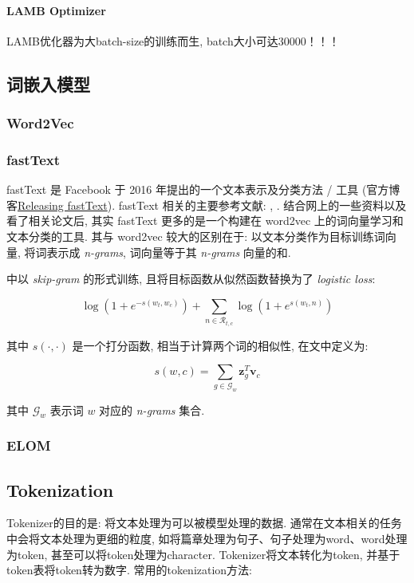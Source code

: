 \paragraph{LAMB Optimizer}
LAMB优化器为大batch-size的训练而生, batch大小可达30000！！！


\subsection{词嵌入模型}
\subsubsection{Word2Vec}

\subsubsection{fastText}
fastText 是 Facebook 于 2016 年提出的一个文本表示及分类方法 / 工具 (官方博客\href{https://fasttext.cc/blog/2016/08/18/blog-post.html}{Releasing fastText}). fastText 相关的主要参考文献: \cite{armand_fasttext_2016}, \cite{piotr_fasttext_2017}. 结合网上的一些资料以及看了相关论文后, 其实 fastText 更多的是一个构建在 word2vec 上的词向量学习和文本分类的工具. 其与 word2vec 较大的区别在于: 以文本分类作为目标训练词向量, 将词表示成 \textit{n-grams}, 词向量等于其 \textit{n-grams} 向量的和. 

\cite{piotr_fasttext_2017} 中以 \textit{skip-gram} 的形式训练, 且将目标函数从似然函数替换为了 \textit{logistic loss}:

$$
\log (1+e^{-s(w_t, w_c)}) + \sum_{n \in \mathcal{R}_{t,c}} \log (1+e^{s(w_t, n)})
$$

其中 $s(\cdot, \cdot)$ 是一个打分函数, 相当于计算两个词的相似性, 在文中定义为:

$$
s(w, c) = \sum_{g \in \mathcal{G}_w} \boldsymbol{z}_g^T \boldsymbol{v}_c
$$

其中 $\mathcal{G}_w$ 表示词 $w$ 对应的 \textit{n-grams} 集合.

\subsubsection{ELOM}


\subsection{Tokenization}
Tokenizer的目的是: 将文本处理为可以被模型处理的数据. 通常在文本相关的任务中会将文本处理为更细的粒度, 如将篇章处理为句子、句子处理为word、word处理为token, 甚至可以将token处理为character. Tokenizer将文本转化为token, 并基于token表将token转为数字. 常用的tokenization方法: 
